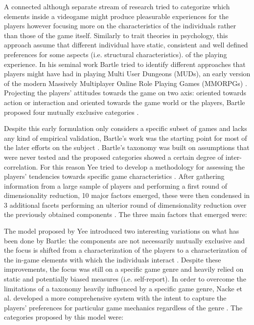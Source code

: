 A connected although separate stream of research tried to categorize which elements inside a videogame might produce pleasurable experiences for the players however focusing more on the characteristics of the individuals rather than those of the game itself. Similarly to trait theories in psychology, this approach assume that different individual have static, consistent and well defined preferences for some aspects (i.e. structural characteristics). of the playing experience. In his seminal work Bartle tried to identify different approaches that players might have had in playing Multi User Dungeons (MUDs), an early version of the modern Massively Multiplayer Online Role Playing Games (MMORPGs) \cite{bartle1996hearts}. Projecting the players’ attitudes towards the game on two axis: oriented towards action or interaction and oriented towards the game world or the players, Bartle proposed four mutually exclusive categories \cite{bartle1996hearts}.



Despite this early formulation only considers a specific subset of games and lacks any kind of empirical validation, Bartle's work was the starting point for most of the later efforts on the subject \cite{bartle1996hearts}. Bartle's taxonomy was built on assumptions that were never tested and the proposed categories showed a certain degree of inter-correlation. For this reason Yee tried to develop a methodology for assessing the players’ tendencies towards specific game characteristics \cite{yee2006motivations}. After gathering information from a large sample of players and performing a first round of dimensionality reduction, 10 major factors emerged, these were then condensed in 3 additional facets performing an ulterior round of dimensionality reduction over the previously obtained components \cite{yee2006motivations}. The three main factors that emerged were: 



The model proposed by Yee introduced two interesting variations on what has been done by Bartle: the components are not necessarily mutually exclusive and the focus is shifted from a characterization of the players to a characterization of the in-game elements with which the individuals interact \cite{bartle1996hearts,yee2006motivations}. Despite these improvements, the focus was still on a specific game genre and heavily relied on static and potentially biased measures (i.e. self-report). In order to overcome the limitations of a taxonomy heavily influenced by a specific game genre, Nacke et al. developed a more comprehensive system with the intent to capture the players’ preferences for particular game mechanics regardless of the genre \cite{nacke2011brainhex}. The categories proposed by this model were: 

